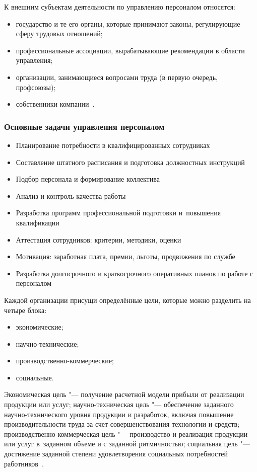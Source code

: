 \documentclass{../industrial-development}
\begin{document}
К внешним субъектам деятельности по управлению персоналом относятся:
\begin{itemize} 
	\item	государство и те его органы, которые принимают законы, регулирующие сферу трудовых отношений;
	\item	профессиональные ассоциации, вырабатывающие рекомендации в области управления;
	\item	организации, занимающиеся вопросами труда (в первую очередь, профсоюзы);
	\item	собственники компании~\cite[с.~83--84]{Maslova}.
\end{itemize} 

\begin{frame} \frametitle{Основные задачи управления персоналом}
	\begin{itemize}
		\item Планирование потребности в квалифицированных сотрудниках
		\item Составление штатного расписания и подготовка должностных инструкций
		\item Подбор персонала и формирование коллектива
		\item Анализ и контроль качества работы 
		\item Разработка программ профессиональной подготовки и~повышения квалификации
		\item Аттестация сотрудников: критерии, методики, оценки
		\item Мотивация: заработная плата, премии, льготы, продвижения по службе
		\item Разработка долгосрочного и краткосрочного оперативных планов по работе с персоналом
	\end{itemize}
\end{frame}

\lecturenotes

Каждой организации присущи определённые цели, которые можно разделить на четыре блока:

\begin{itemize}
	\item	экономические;
	\item	научно-технические;
	\item	производственно-коммерческие;
	\item	социальные.
\end{itemize}

\alert{Экономическая цель} "--- получение расчетной модели прибыли от реализации продукции или услуг; \alert{научно-техническая цель} "--- обеспечение заданного научно-технического уровня продукции и разработок, включая повышение производительности труда за счет совершенствования технологии и средств; 
\alert{производственно-коммерческая цель} "--- производство и реализация продукции или услуг в~заданном объеме и с заданной ритмичностью; \alert{социальная цель} "--- достижение заданной степени удовлетворения социальных потребностей работников~\cite[с.~84--85]{Maslova}.
\end{document}

